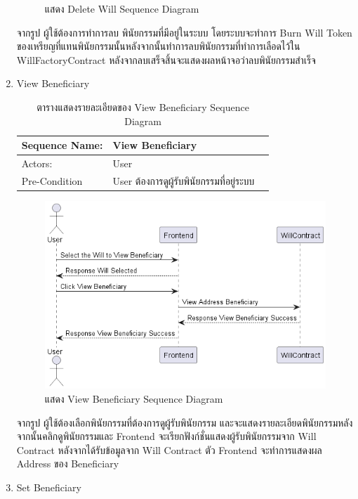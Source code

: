 \documentclass[12pt,oneside,openright,a4paper]{cpe-thai-project}
\begin{document}
\begin{enumerate}[label=\thesubsection.\arabic*,leftmargin=0pt,itemindent=1.25cm]
\begin{figure}[!thb]
			\caption{แสดง Delete Will Sequence Diagram}
		\end{figure}
		\FloatBarrier
	\tab จากรูป ผู้ใช้ต้องการทำการลบ พินัยกรรมที่มีอยู่ในระบบ โดยระบบจะทำการ Burn Will Token ของเหรียญที่แทนพินัยกรรมนั้นหลังจากนั้นทำการลบพินัยกรรมที่ทำการเลือดไว้ใน WillFactoryContract หลังจากลบเสร็จสิ้นจะแสดงผลหน้าจอว่าลบพินัยกรรมสำเร็จ 
\clearpage
\item View Beneficiary
	\begin{table}[h]
	\centering
	\caption{ตารางแสดงรายละเอียดของ View Beneficiary Sequence Diagram}
	\begin{tabularx}{\textwidth}{|l|X|X|} 
		\hline
		Sequence Name: & View Beneficiary                                    \\ 
		\hline
		Actors:        & User                                                  \\ 
		\hline
		Pre-Condition  & User ต้องการดูผู้รับพินัยกรรมที่อยู่ระบบ \\
		\hline
		\end{tabularx}
	\end{table}
		\begin{figure}[!thb]
			\centering
			\includegraphics[scale=0.6]{viewBeneficiaryseq}
			\caption{แสดง View Beneficiary Sequence Diagram}
		\end{figure}
		\FloatBarrier
	\tab จากรูป ผู้ใช้ต้องเลือกพินัยกรรมที่ต้องการดูผู้รับพินัยกรรม และจะแสดงรายละเอียดพินัยกรรมหลังจากนั้นคลิกดูพินัยกรรมและ Frontend จะเรียกฟังก์ชั่นแสดงผู้รับพินัยกรรมจาก Will Contract หลังจากได้รับข้อมูลจาก Will Contract ตัว Frontend จะทำการแสดงผล Address ของ Beneficiary 
\item Set Beneficiary
	\begin{table}[h]

\end{table}
\end{enumerate}
\end{document}
